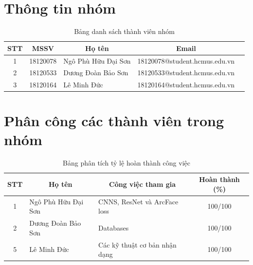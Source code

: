 \documentclass[a4paper, 12pt]{article}
\begin{document}
\section{Thông tin nhóm}
    \begin{table}[H]
        \centering
        \begin{tabular}{|c|c|l|c|c|}
        \hline
        STT & MSSV     & \multicolumn{1}{c|}{Họ tên} & Email\\ \hline
        1   & 18120078 & Ngô Phù Hữu Đại Sơn         & 18120078@student.hcmus.edu.vn\\ \hline
        2   & 18120533 & Dương Đoàn Bảo Sơn          & 18120533@student.hcmus.edu.vn\\ \hline
        3   & 18120164 & Lê Minh Đức                 & 18120164@student.hcmus.edu.vn\\ \hline
        \end{tabular}
        \caption{Bảng danh sách thành viên nhóm}
    \end{table}

\section{Phân công các thành viên trong nhóm}

    \begin{table}[H]
        \centering
        \begin{tabular}{|c|l|l|c|}
        \hline
        STT & \multicolumn{1}{c|}{Họ tên} & \multicolumn{1}{c|}{Công việc tham gia}  & Hoàn thành (\%) \\ \hline
        1   & Ngô Phù Hữu Đại Sơn         & CNNS, ResNet và ArcFace loss             & 100/100 \\ \hline
        2   & Dương Đoàn Bảo Sơn          & Databases                                & 100/100 \\ \hline
        5   & Lê Minh Đức                 & Các kỹ thuật cơ bản nhận dạng            & 100/100 \\ \hline
        \end{tabular}
        \caption{Bảng phân tích tỷ lệ hoàn thành công việc}
    \end{table}
    \clearpage
\end{document}
